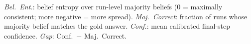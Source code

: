 \begin{table}[t]
\vspace{2pt}
\footnotesize
\emph{Bel.\ Ent.}: belief entropy over run-level majority beliefs
($0$ = maximally consistent; more negative = more spread).
\emph{Maj.\ Correct}: fraction of runs whose majority belief matches the gold answer.
\emph{Conf.}: mean calibrated final-step confidence.
\emph{Gap}: Conf.\ $-$ Maj.\ Correct.
\end{table}
